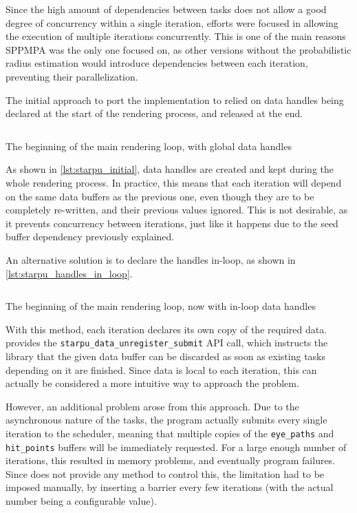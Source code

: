 \documentclass[main.tex]{subfiles}
\begin{document}
Since the high amount of dependencies between tasks does not allow a good degree of concurrency within a single iteration, efforts were focused in allowing the execution of multiple iterations concurrently. This is one of the main reasons SPPMPA was the only one focused on, as other versions without the probabilistic radius estimation would introduce dependencies between each iteration, preventing their parallelization.

The initial approach to port the implementation to \starpu relied on data handles being declared at the start of the rendering process, and released at the end.

\begin{listing}[htp]
  \inputminted[linenos,tabsize=4]{c++}{code/starpu_initial.cpp}

  \caption{The beginning of the main rendering loop, with global data handles}
  \label{lst:starpu_initial}
\end{listing}

As shown in \cref{lst:starpu_initial}, data handles are created and kept during the whole rendering process. In practice, this means that each iteration will depend on the same data buffers as the previous one, even though they are to be completely re-written, and their previous values ignored. This is not desirable, as it prevents concurrency between iterations, just like it happens due to the seed buffer dependency previously explained.

An alternative solution is to declare the handles in-loop, as shown in \cref{lst:starpu_handles_in_loop}.

\begin{listing}[htp]
  \inputminted[linenos,tabsize=4]{c++}{code/starpu_handles_in_loop.cpp}

  \caption{The beginning of the main rendering loop, now with in-loop data handles}
  \label{lst:starpu_handles_in_loop}
\end{listing}

With this method, each iteration declares its own copy of the required data. \starpu provides the \texttt{starpu\_data\_unregister\_submit} API call, which instructs the library that the given data buffer can be discarded as soon as existing tasks depending on it are finished. Since data is local to each iteration, this can actually be considered a more intuitive way to approach the problem.

However, an additional problem arose from this approach. Due to the asynchronous nature of the tasks, the program actually submits every single iteration to the scheduler, meaning that multiple copies of the \texttt{eye\_paths} and \texttt{hit\_points} buffers will be immediately requested. For a large enough number of iterations, this resulted in memory problems, and eventually program failures. Since \starpu does not provide any method to control this, the limitation had to be imposed manually, by inserting a barrier every few iterations (with the actual number being a configurable value).
\end{document}
